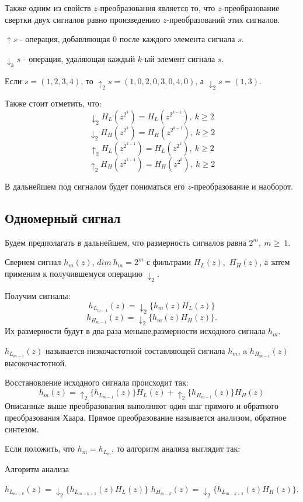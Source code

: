 \documentclass[oneside, final, 14pt]{article}
\begin{document}
Также одним из свойств $z$-преобразования является то, что $z$-преобразование свертки двух сигналов равно произведению $z$-преобразований этих сигналов. 

\textbf{$\uparrow s$} - операция, добавляющая $0$ после каждого элемента сигнала $s$.

\textbf{$\downarrow_k s$} - операция, удаляющая каждый $k$-ый элемент сигнала $s$.

Если $s = (1,2,3,4)$, то $\uparrow_2 s = (1,0,2,0,3,0,4,0)$, а $\downarrow_{2} s = (1,3)$.

Также стоит отметить, что:
$$\downarrow_2 H_L(z^{2^k}) = H_L(z^{2^{k-1}}),~ k\geq 2$$
$$\downarrow_2 H_H(z^{2^k}) = H_H(z^{2^{k-1}}),~ k\geq 2$$
$$\uparrow_2 H_L(z^{2^{k-1}}) = H_L(z^{2^{k}}),~ k\geq 2$$
$$\uparrow_2 H_H(z^{2^{k-1}}) = H_H(z^{2^{k}}),~ k\geq 2$$

В дальнейшем под сигналом будет пониматься его $z$-преобразование и наоборот.
\subsection{Одномерный сигнал}
Будем предполагать в дальнейшем, что размерность сигналов равна $2^m,~m \geq~1$.

Свернем сигнал $h_m(z)$, $dim~h_m = 2^m$ с фильтрами $H_L(z)$,~$H_H(z)$, а затем применим к получившемуся операцию $\downarrow_2$.

Получим сигналы: $$h_{L_{m-1}}(z) = \downarrow_2 \{h_m(z)H_L(z)\}$$ $$h_{H_{m-1}}(z) = \downarrow_2 \{h_m(z)H_H(z)\}.$$ Их размерности будут в два раза меньше,размерности исходного сигнала $h_m$.

$h_{L_{m-1}}(z)$ называется низкочастотной составляющей сигнала $h_m$, a $h_{H_{m-1}}(z)$ высокочастотной. 

Восстановление исходного сигнала происходит так:
$$h_m(z) = \uparrow_2 \{ h_{L_{m-1}}(z) \} H_L(z) + \uparrow_2 \{ h_{H_{m-1}}(z) \} H_H(z)	$$
Описанные выше преобразования выполняют один шаг прямого и обратного преобразования Хаара. Прямое преобразование называется анализом, обратное синтезом.

Если положить, что $h_m = h_{L_m}$, то алгоритм анализа выглядит так:
\begin{algorithm}
\caption{Алгоритм анализа}
\begin{algorithmic}
	\State $h_{L_{m-k}}(z) = \downarrow_2 \{h_{L_{m-k+1}}(z)H_L(z)\}$
	\State $h_{H_{m-k}}(z) = \downarrow_2 \{h_{L_{m-k+1}}(z)H_H(z)\}.$
	\EndFor
\end{algorithmic}
\end{algorithm}
\end{document}
